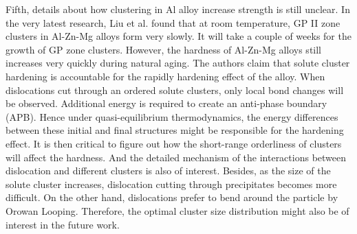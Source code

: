 Fifth, details about how clustering in Al alloy increase strength is still unclear. In the very latest research, Liu et al. \cite{liu2020formation} found that at room temperature, \ac{GP} II zone clusters in Al-Zn-Mg alloys form very slowly. It will take a couple of weeks for the growth of \ac{GP} zone clusters. However, the hardness of Al-Zn-Mg alloys still increases very quickly during natural aging. The authors claim that solute cluster hardening is accountable for the rapidly hardening effect of the alloy. When dislocations cut through an ordered solute clusters, only local bond changes will be observed. Additional energy is required to create an anti-phase boundary (APB). Hence under quasi-equilibrium thermodynamics, the energy differences between these initial and final structures might be responsible for the hardening effect. It is then critical to figure out how the short-range orderliness of clusters will affect the hardness. And the detailed mechanism of the interactions between dislocation and different clusters is also of interest. Besides, as the size of the solute cluster increases, dislocation cutting through precipitates becomes more difficult. On the other hand, dislocations prefer to bend around the particle by Orowan Looping. Therefore, the optimal cluster size distribution might also be of interest in the future work. 